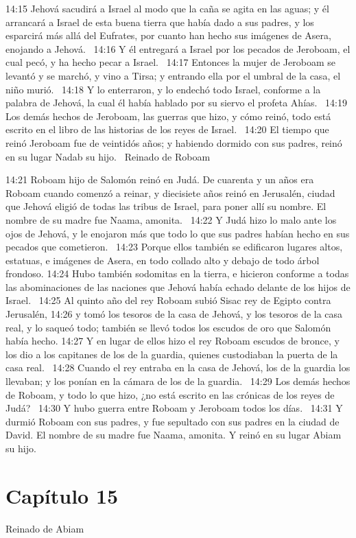 14:15 Jehová sacudirá a Israel al modo que la caña se agita en las aguas; y él arrancará a Israel de esta buena tierra que había dado a sus padres, y los esparcirá más allá del Eufrates, por cuanto han hecho sus imágenes de Asera, enojando a Jehová.  
14:16 Y él entregará a Israel por los pecados de Jeroboam, el cual pecó, y ha hecho pecar a Israel.  
14:17 Entonces la mujer de Jeroboam se levantó y se marchó, y vino a Tirsa; y entrando ella por el umbral de la casa, el niño murió.  
14:18 Y lo enterraron, y lo endechó todo Israel, conforme a la palabra de Jehová, la cual él había hablado por su siervo el profeta Ahías.  
14:19 Los demás hechos de Jeroboam, las guerras que hizo, y cómo reinó, todo está escrito en el libro de las historias de los reyes de Israel.  
14:20 El tiempo que reinó Jeroboam fue de veintidós años; y habiendo dormido con sus padres, reinó en su lugar Nadab su hijo.  
Reinado de Roboam  

14:21 Roboam hijo de Salomón reinó en Judá. De cuarenta y un años era Roboam cuando comenzó a reinar, y diecisiete años reinó en Jerusalén, ciudad que Jehová eligió de todas las tribus de Israel, para poner allí su nombre. El nombre de su madre fue Naama, amonita.  
14:22 Y Judá hizo lo malo ante los ojos de Jehová, y le enojaron más que todo lo que sus padres habían hecho en sus pecados que cometieron.  
14:23 Porque ellos también se edificaron lugares altos, estatuas, e imágenes de Asera, en todo collado alto y debajo de todo árbol frondoso. 
14:24 Hubo también sodomitas en la tierra, e hicieron conforme a todas las abominaciones de las naciones que Jehová había echado delante de los hijos de Israel.  
14:25 Al quinto año del rey Roboam subió Sisac rey de Egipto contra Jerusalén, 
14:26 y tomó los tesoros de la casa de Jehová, y los tesoros de la casa real, y lo saqueó todo; también se llevó todos los escudos de oro que Salomón había hecho. 
14:27 Y en lugar de ellos hizo el rey Roboam escudos de bronce, y los dio a los capitanes de los de la guardia, quienes custodiaban la puerta de la casa real.  
14:28 Cuando el rey entraba en la casa de Jehová, los de la guardia los llevaban; y los ponían en la cámara de los de la guardia.  
14:29 Los demás hechos de Roboam, y todo lo que hizo, ¿no está escrito en las crónicas de los reyes de Judá?  
14:30 Y hubo guerra entre Roboam y Jeroboam todos los días.  
14:31 Y durmió Roboam con sus padres, y fue sepultado con sus padres en la ciudad de David. El nombre de su madre fue Naama, amonita. Y reinó en su lugar Abiam su hijo.  
\section*{Capítulo 15}
Reinado de Abiam  


